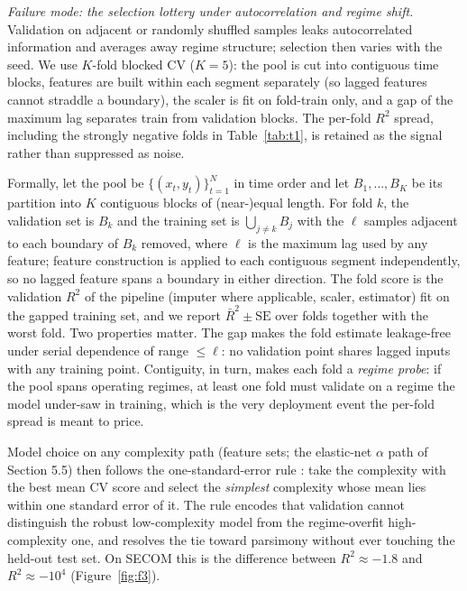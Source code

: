 \emph{Failure mode: the selection lottery under autocorrelation and regime shift.}
Validation on adjacent or randomly shuffled samples leaks autocorrelated information
and averages away regime structure; selection then varies with the seed. We use
\(K\)-fold blocked CV (\(K = 5\)): the pool is cut into contiguous time blocks, features
are built within each segment separately (so lagged features cannot straddle a
boundary), the scaler is fit on fold-train only, and a gap of the maximum lag
separates train from validation blocks. The per-fold \(R^2\) spread, including the
strongly negative folds in Table~\ref{tab:t1}, is retained as the signal rather than
suppressed as noise.

Formally, let the pool be \(\{(x_t, y_t)\}_{t=1}^{N}\) in time order and let
\(B_1, \dots, B_K\) be its partition into \(K\) contiguous blocks of (near-)equal length.
For fold \(k\), the validation set is \(B_k\) and the training set is
\(\bigcup_{j \neq k} B_j\) with the \(\ell\) samples adjacent to each boundary of \(B_k\)
removed, where \(\ell\) is the maximum lag used by any feature; feature construction is
applied to each contiguous segment independently, so no lagged feature spans a
boundary in either direction. The fold score is the validation \(R^2\) of the pipeline
(imputer where applicable, scaler, estimator) fit on the gapped training set, and we
report \(\bar{R}^2 \pm \mathrm{SE}\) over folds together with the worst fold. Two
properties matter. The gap makes the fold estimate leakage-free under serial
dependence of range \(\leq \ell\): no validation point shares lagged inputs with any
training point. Contiguity, in turn, makes each fold a \emph{regime probe}: if the pool spans
operating regimes, at least one fold must validate on a regime the model under-saw in
training, which is the very deployment event the per-fold spread is meant to
price.

Model choice on any complexity path (feature sets; the elastic-net \(\alpha\) path of
Section 5.5) then follows the one-standard-error rule \citep{hastie2009}: take the
complexity with the best mean CV score and select the \emph{simplest} complexity whose mean
lies within one standard error of it. The rule encodes that validation cannot
distinguish the robust low-complexity model from the regime-overfit high-complexity
one, and resolves the tie toward parsimony without ever touching the held-out test
set. On SECOM this is the difference between \(R^2 \approx -1.8\) and \(R^2 \approx -10^4\) (Figure~\ref{fig:f3}).

